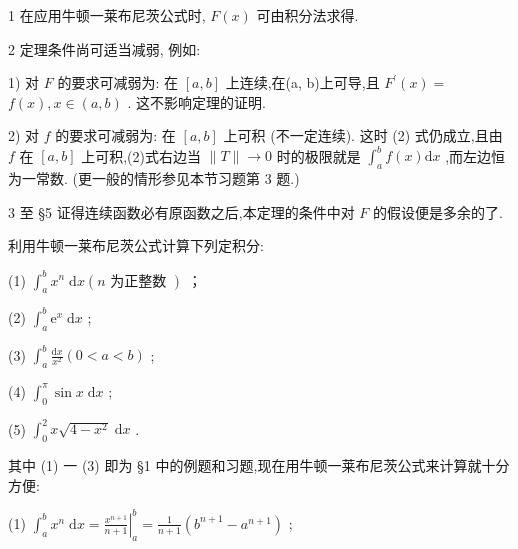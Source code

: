 \begin{remark}

\end{remark}
1 在应用牛顿一莱布尼茨公式时, \(F\left( x\right)\) 可由积分法求得.

\begin{remark}

\end{remark}
2 定理条件尚可适当减弱, 例如:

1) 对 \(F\) 的要求可减弱为: 在 \(\left\lbrack  {a,b}\right\rbrack\) 上连续,在(a, b)上可导,且 \({F}^{\prime }\left( x\right)  =\)  \(f\left( x\right) ,x \in  \left( {a,b}\right)\) . 这不影响定理的证明.

2) 对 \(f\) 的要求可减弱为: 在 \(\left\lbrack  {a,b}\right\rbrack\) 上可积 (不一定连续). 这时 (2) 式仍成立,且由 \(f\) 在 \(\left\lbrack  {a,b}\right\rbrack\) 上可积,(2)式右边当 \(\parallel T\parallel  \rightarrow  0\) 时的极限就是 \({\int }_{a}^{b}f\left( x\right) \mathrm{d}x\) ,而左边恒为一常数. (更一般的情形参见本节习题第 3 题.)

\begin{remark}

\end{remark}
3 至 §5 证得连续函数必有原函数之后,本定理的条件中对 \(F\) 的假设便是多余的了.

\begin{example}

\end{example}
利用牛顿一莱布尼茨公式计算下列定积分:

(1) \({\int }_{a}^{b}{x}^{n}\mathrm{\;d}x\left( {n\text{ 为正整数 }}\right)\) ； 

(2) \({\int }_{a}^{b}{\mathrm{e}}^{x}\mathrm{\;d}x\) ;

(3) \({\int }_{a}^{b}\frac{\mathrm{d}x}{{x}^{2}}\left( {0 < a < b}\right)\) ;

(4) \({\int }_{0}^{\pi }\sin x\mathrm{\;d}x\) ;

(5) \({\int }_{0}^{2}x\sqrt{4 - {x}^{2}}\mathrm{\;d}x\) .

\begin{solution}

\end{solution}
其中 (1) 一 (3) 即为 §1 中的例题和习题,现在用牛顿一莱布尼茨公式来计算就十分方便:

(1) \({\int }_{a}^{b}{x}^{n}\mathrm{\;d}x = {\left. \frac{{x}^{n + 1}}{n + 1}\right| }_{a}^{b} = \frac{1}{n + 1}\left( {{b}^{n + 1} - {a}^{n + 1}}\right)\) ;

